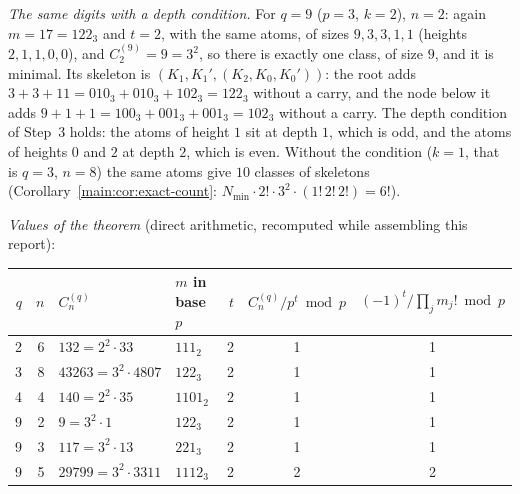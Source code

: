 \documentclass[11pt]{article}
\theoremstyle{definition}
\theoremstyle{remark}
\numberwithin{equation}{section}
\numberwithin{figure}{section}
\begin{document}
\emph{The same digits with a depth condition.} For $q=9$ ($p=3$, $k=2$), $n=2$: again $m=17=122_3$ and $t=2$,
with the same atoms, of sizes $9,3,3,1,1$ (heights $2,1,1,0,0$), and $C_2^{(9)}=9=3^2$, so there is exactly
one class, of size $9$, and it is minimal. Its skeleton is $(K_1,K_1',(K_2,K_0,K_0'))$: the root adds
$3+3+11=010_3+010_3+102_3=122_3$ without a carry, and the node below it adds $9+1+1=100_3+001_3+001_3=102_3$
without a carry. The depth condition of Step~3 holds: the atoms of height $1$ sit at depth $1$, which is odd,
and the atoms of heights $0$ and $2$ at depth $2$, which is even. Without the condition ($k=1$, that is
$q=3$, $n=8$) the same atoms give $10$ classes of skeletons (Corollary~\ref{main:cor:exact-count}:
$N_{\min}\cdot2!\cdot3^2\cdot(1!\,2!\,2!)=6!$).

\emph{Values of the theorem} (direct arithmetic, recomputed while assembling this report):
\begin{center}\small
\begin{tabular}{@{}rrllrcc@{}}
\toprule
$q$ & $n$ & $C_n^{(q)}$ & $m$ in base $p$ & $t$ & $C_n^{(q)}/p^t \bmod p$ & $(-1)^t/\prod_jm_j! \bmod p$\\
\midrule
2 & 6 & $132=2^2\cdot33$ & $111_2$ & 2 & 1 & 1\\
3 & 8 & $43263=3^2\cdot4807$ & $122_3$ & 2 & 1 & 1\\
4 & 4 & $140=2^2\cdot35$ & $1101_2$ & 2 & 1 & 1\\
9 & 2 & $9=3^2\cdot1$ & $122_3$ & 2 & 1 & 1\\
9 & 3 & $117=3^2\cdot13$ & $221_3$ & 2 & 1 & 1\\
9 & 5 & $29799=3^2\cdot3311$ & $1112_3$ & 2 & 2 & 2\\
\bottomrule
\end{tabular}
\end{center}
\end{document}
